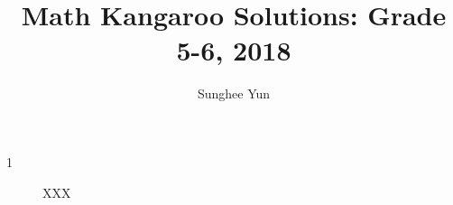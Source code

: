 \documentclass{article}
\title{Math Kangaroo Solutions: Grade 5-6, 2018}
\author{Sunghee Yun}
\begin{document}
\maketitle

\begin{description}
\item [1]
\begin{solution}
XXX
\end{solution}

\end{description}
\end{document}
